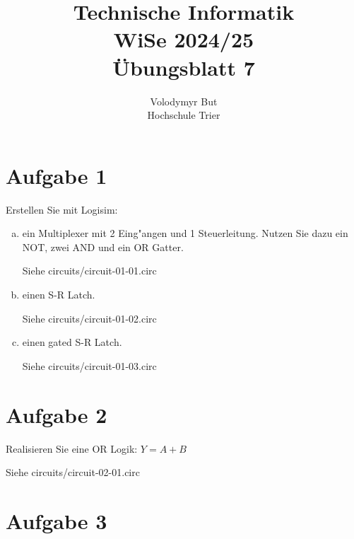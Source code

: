 \documentclass[10pt, oneside]{article}
\title{Technische Informatik\\[10pt]\Large{WiSe 2024/25}\\[15pt]\Large{{\"U}bungsblatt 7}}
\author{Volodymyr But\\[10pt]Hochschule Trier}
\date{}
\begin{document}
\maketitle
\vspace{25px}

\section{Aufgabe 1}

Erstellen Sie mit Logisim:

\begin{enumerate}[(a)]
    \item ein Multiplexer mit 2 Eing"angen und 1 Steuerleitung. Nutzen Sie dazu ein NOT, zwei AND und ein OR Gatter.

        Siehe circuits/circuit-01-01.circ

    \item einen S-R Latch.

        Siehe circuits/circuit-01-02.circ

    \item einen gated S-R Latch.

        Siehe circuits/circuit-01-03.circ
\end{enumerate}

\section{Aufgabe 2}

Realisieren Sie eine OR Logik: $Y = A + B$

Siehe circuits/circuit-02-01.circ

\section{Aufgabe 3}
\end{document}
